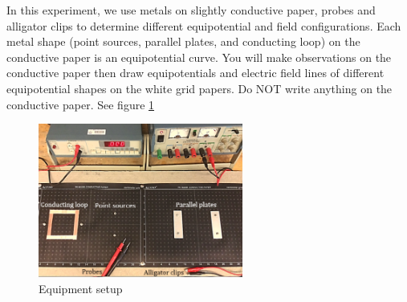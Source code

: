 In this experiment, we use metals on slightly conductive paper, probes and alligator clips  to determine different equipotential and field configurations. Each metal shape (point sources, parallel plates, and conducting loop) on the conductive paper is an equipotential curve. You will make observations on the conductive paper then draw equipotentials and electric field lines of different equipotential shapes on the white grid papers. Do NOT write anything on the conductive paper. See figure \ref{fig:equip_setup}   
\begin{figure}[h]
    \begin{center}
        \includegraphics[width=0.6\textwidth]{./Exp1/pic/Picture1.png}
    \end{center}
    \caption{Equipment setup}
    \label{fig:equip_setup}
\end{figure}

